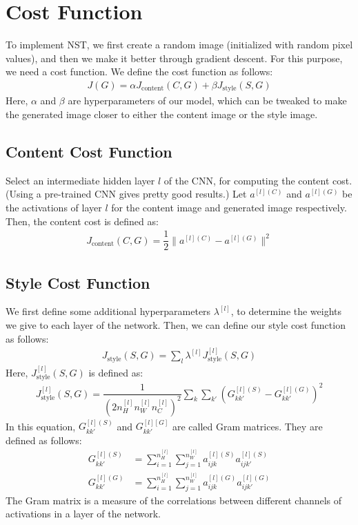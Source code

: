 \documentclass[a4paper, 12pt]{report}
\begin{document}
\section{Cost Function}
To implement NST, we first create a random image (initialized with random pixel values), and then we make it better through gradient descent. For this purpose, we need a cost function. We define the cost function as follows:
\begin{align*}
J(G) = \alpha J_{\text{content}}(C,G) + \beta J_{\text{style}}(S,G)
\end{align*}
Here, $\alpha$ and $\beta$ are hyperparameters of our model, which can be tweaked to make the generated image closer to either the content image or the style image.

\subsection{Content Cost Function}
Select an intermediate hidden layer $l$ of the CNN, for computing the content cost. (Using a pre-trained CNN gives pretty good results.) Let $a^{[l](C)}$ and $a^{[l](G)}$ be the activations of layer $l$ for the content image and generated image respectively. Then, the content cost is defined as:
\begin{align*}
J_{\text{content}}(C,G) = \dfrac{1}{2}\lVert a^{[l](C)}-a^{[l](G)}\rVert^2
\end{align*}

\subsection{Style Cost Function}
We first define some additional hyperparameters $\lambda^{[l]}$, to determine the weights we give to each layer of the network. Then, we can define our style cost function as follows:
\begin{align*}
J_{\text{style}}(S,G) = \sum_{l}\lambda^{[l]}J_{\text{style}}^{[l]}(S,G)
\end{align*}
Here, $J_{\text{style}}^{[l]}(S,G)$ is defined as:
\begin{align*}
J_{\text{style}}^{[l]}(S,G) = \dfrac{1}{\left(2n_H^{[l]}n_W^{[l]}n_C^{[l]}\right)^2}\sum_{k}\sum_{k'}\left(G_{kk'}^{[l](S)}-G_{kk'}^{[l](G)}\right)^2
\end{align*}
In this equation, $G_{kk'}^{[l](S)}$ and $G_{kk'}^{[l][G]}$ are called Gram matrices. They are defined as follows:
\begin{align*}
G_{kk'}^{[l](S)} &= \sum_{i=1}^{n_H^{[l]}}\sum_{j=1}^{n_W^{[l]}}a_{ijk}^{[l](S)}a_{ijk'}^{[l](S)}\\
G_{kk'}^{[l](G)} &= \sum_{i=1}^{n_H^{[l]}}\sum_{j=1}^{n_W^{[l]}}a_{ijk}^{[l](G)}a_{ijk'}^{[l](G)}
\end{align*}
The Gram matrix is a measure of the correlations between different channels of activations in a layer of the network.
\end{document}
